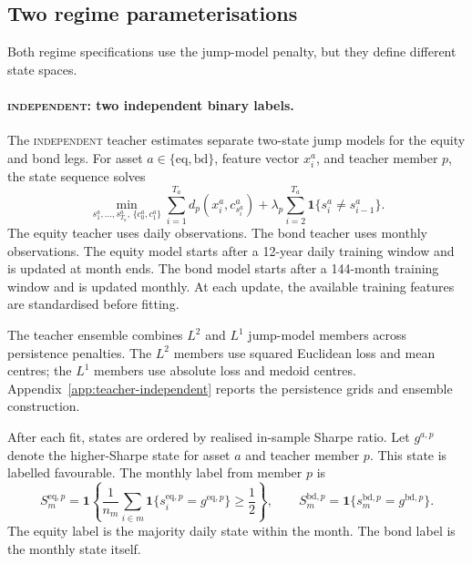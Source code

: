 ﻿\documentclass[10pt]{article}
\newcommand{\Bindep}{\textsc{independent}}
\begin{document}
\subsection{Two regime parameterisations}
\label{sec:two-parameterisations}

Both regime specifications use the jump-model penalty, but they define different state spaces.

\paragraph{\Bindep{}: two independent binary labels.}
The \Bindep{} teacher estimates separate two-state jump models for the equity and bond legs. For asset \(a\in\{\mathrm{eq},\mathrm{bd}\}\), feature vector \(x^a_i\), and teacher member \(p\), the state sequence solves
\begin{equation}
    \min_{s^a_1,\dots,s^a_{T_a},\,\{c^a_0,c^a_1\}}
    \sum_{i=1}^{T_a} d_p\!\left(x^a_i,c^a_{s^a_i}\right)
    +\lambda_p\sum_{i=2}^{T_a}\mathbf{1}\{s^a_i\neq s^a_{i-1}\}.
    \label{eq:independent-teacher}
\end{equation}
The equity teacher uses daily observations. The bond teacher uses monthly observations. The equity model starts after a 12-year daily training window and is updated at month ends. The bond model starts after a 144-month training window and is updated monthly. At each update, the available training features are standardised before fitting.

The teacher ensemble combines \(L^2\) and \(L^1\) jump-model members across persistence
penalties. The \(L^2\) members use squared Euclidean loss and mean centres; the \(L^1\)
members use absolute loss and medoid centres. Appendix~\ref{app:teacher-independent}
reports the persistence grids and ensemble construction.

After each fit, states are ordered by realised in-sample Sharpe ratio. Let \(g^{a,p}\) denote the higher-Sharpe state for asset \(a\) and teacher member \(p\). This state is labelled favourable. The monthly label from member \(p\) is
\begin{equation}
    S^{\mathrm{eq},p}_m
    =
    \mathbf{1}\!\left\{
    \frac{1}{n_m}\sum_{i\in m}\mathbf{1}\{s^{\mathrm{eq},p}_i=g^{\mathrm{eq},p}\}
    \ge \frac{1}{2}
    \right\},
    \qquad
    S^{\mathrm{bd},p}_m
    =
    \mathbf{1}\{s^{\mathrm{bd},p}_m=g^{\mathrm{bd},p}\}.
    \label{eq:independent-monthly-label}
\end{equation}
The equity label is the majority daily state within the month. The bond label is the monthly state itself.
\end{document}
